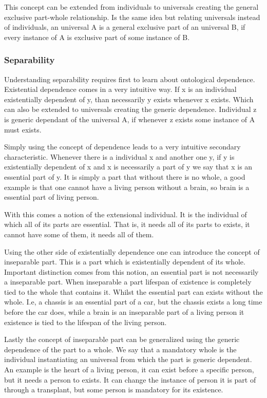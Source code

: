 This concept can be extended from individuals to universals creating the general exclusive part-whole relationship. Is the same idea but relating universals instead of individuals, an universal A is a general exclusive part of an universal B, if every instance of A is exclusive part of some instance of B.

\subsubsection{Separability}

Understanding separability requires first to learn about ontological dependence. Existential dependence comes in a very intuitive way. If x is an individual existentially dependent of y, than necessarily y exists whenever x exists. Which can also be extended to universals creating the generic dependence. Individual z is generic dependant of the universal A, if whenever z exists some instance of A must exists.

Simply using the concept of dependence leads to a very intuitive secondary characteristic. Whenever there is a individual x and another one y, if y is existentially dependent of x and x is necessarily a part of y we say that x is an essential part of y. It is simply a part that without there is no whole, a good example is that one cannot have a living person without a brain, so brain is a essential part of living person. 

With this comes a notion of the extensional individual. It is the individual of which all of its parts are essential. That is, it needs all of its parts to exists, it cannot have some of them, it needs all of them.

Using the other side of existentially dependence one can introduce the concept of inseparable part. This is a part which is existentially dependent of its whole. Important distinction comes from this notion, an essential part is not necessarily a inseparable part. When inseparable a part lifespan of existence is completely tied to the whole that contains it. Whilst the essential part can exists without the whole. I.e, a chassis is an essential part of a car, but the chassis exists a long time before the car does, while a brain is an inseparable part of a living person it existence is tied to the lifespan of the living person.

Lastly the concept of inseparable part can be generalized using the generic dependence of the part to a whole. We say that a mandatory whole is the individual instantiating an universal from which the part is generic dependent. An example is the heart of a living person, it can exist before a specific person, but it needs a person to exists. It can change the instance of person it is part of through a transplant, but some person is mandatory for its existence.

